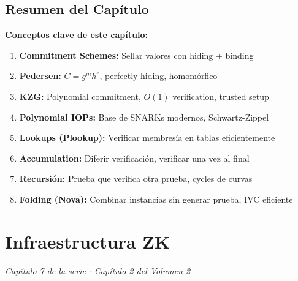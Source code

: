 \documentclass[11pt,a4paper,twoside]{book}
\begin{document}
\section{Resumen del Cap\'itulo}

\begin{keyidea}
\textbf{Conceptos clave de este cap\'itulo:}

\begin{enumerate}
    \item \textbf{Commitment Schemes:} Sellar valores con hiding + binding
    
    \item \textbf{Pedersen:} $C = g^m h^r$, perfectly hiding, homom\'orfico
    
    \item \textbf{KZG:} Polynomial commitment, $O(1)$ verification, trusted setup
    
    \item \textbf{Polynomial IOPs:} Base de SNARKs modernos, Schwartz-Zippel
    
    \item \textbf{Lookups (Plookup):} Verificar membres\'ia en tablas eficientemente
    
    \item \textbf{Accumulation:} Diferir verificaci\'on, verificar una vez al final
    
    \item \textbf{Recursi\'on:} Prueba que verifica otra prueba, cycles de curvas
    
    \item \textbf{Folding (Nova):} Combinar instancias sin generar prueba, IVC eficiente
\end{enumerate}
\end{keyidea}


\chapter{Infraestructura ZK}
\label{ch:infraestructura}

\begin{center}
\textit{Cap\'itulo 7 de la serie $\cdot$ Cap\'itulo 2 del Volumen 2}
\end{center}
\end{document}
